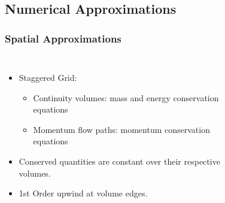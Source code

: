 \documentclass[compress,xcolor=table]{beamer}
\newlength{\hpw}
\begin{document}
\subsection[Numeric Approximations]{Numerical Approximations}
\begin{frame}
\frametitle{Spatial Approximations}

\begin{columns}
\column{\hpw}

\begin{itemize}
\item{Staggered Grid:
\begin{itemize}
\item{Continuity volumes: mass and energy conservation equations}
\item{Momentum flow paths: momentum conservation equations}
\end{itemize}
}
\item{Conserved quantities are constant over their respective volumes.}
\item{1st Order upwind at volume edges.}
\end{itemize}


\column{\hpw}
\begin{figure}
\centering
\resizebox{\textwidth}{!}{

}
\end{figure}
\end{columns}

\end{frame}
\end{document}
